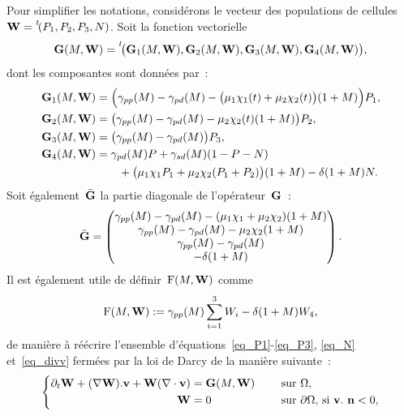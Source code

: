 \documentclass[main.tex]{subfiles}
\begin{document}
Pour simplifier les notations, considérons le vecteur des populations de cellules~${\bf W}=\prescript{\mathit{t\!}}{}{(P_1, P_2, P_3, N)}$. Soit la fonction vectorielle 
\begin{equation}
{\bf G}(M,{\bf W}) = \prescript{\mathit{t\!}}{}{\big({\bf G}_1(M,{\bf W}), {\bf G}_2(M,{\bf W}), {\bf G}_3(M,{\bf W}), {\bf G}_4(M,{\bf W}) \big)},
\end{equation}
dont les composantes sont données par~:
\begin{align}
{\bf G}_1(M,{\bf W}) &= \Big(\gamma_{pp}(M)- \gamma_{pd}(M) - \big(\mu_1 \chi_1 (t)+\mu_2 \chi_2(t) \big)(1+M)\Big) P_1, \\
{\bf G}_2(M,{\bf W}) &= \big(\gamma_{pp}(M)- \gamma_{pd}(M) - \mu_2 \chi_2(t) (1+M)\big)P_2, \\
{\bf G}_3(M,{\bf W}) &= \big(\gamma_{pp}(M) - \gamma_{pd}(M) \big)P_3, \\
{\bf G}_4(M,{\bf W}) &= \gamma_{pd}(M) P +\gamma_{sd}(M) (1-P-N)  \nonumber \\
&\qquad +\big( \mu_1 \chi_1 P_1 + \mu_2\chi_2 (P_1+P_2) \big) (1+M) - \delta(1+M)N.
\end{align}
Soit également~$\bar{{\bf G}}$ la partie diagonale de l'opérateur~${\bf G}$~:
\begin{equation}\label{eq:GG_bar}
\bar{{\bf G}} = \begin{pmatrix}
\gamma_{pp}(M)- \gamma_{pd}(M) - (\mu_1 \chi_1 +\mu_2 \chi_2 )(1+M) \\
\gamma_{pp}(M)- \gamma_{pd}(M) - \mu_2 \chi_2 (1+M) \\
\gamma_{pp}(M) - \gamma_{pd}(M) \\
- \delta(1+M)
\end{pmatrix}.
\end{equation}
Il est également utile de définir~${\rm F}(M,{\bf W})$ comme
\begin{align}
  \label{eq_F}
  {\rm F}(M,{\bf W}):=\gamma_{pp}(M)\sum_{i=1}^3W_i-\delta(1+M)W_4,
\end{align}
de manière à réécrire l'ensemble d'équations~\eqref{eq_P1}-\eqref{eq_P3}, \eqref{eq_N} et~\eqref{eq_divv} fermées par la loi de Darcy de la manière suivante~:
\begin{equation}\label{eq_transport_pop}
\left\{
\begin{aligned}
\partial_t {\bf W} + (\nabla {\bf W}).\mathbf{v} + {\bf W} (\nabla\cdot \mathbf{v}) &= {\bf G}(M,{\bf W}) & \quad \textrm{ sur } & \Omega, \\
{\bf W} &=0 & \quad \textrm{ sur } & \partial \Omega \textrm{, si } \mathbf{v}.\ {\bf n}<0 ,
\end{aligned}
\right.
\end{equation}
\end{document}
